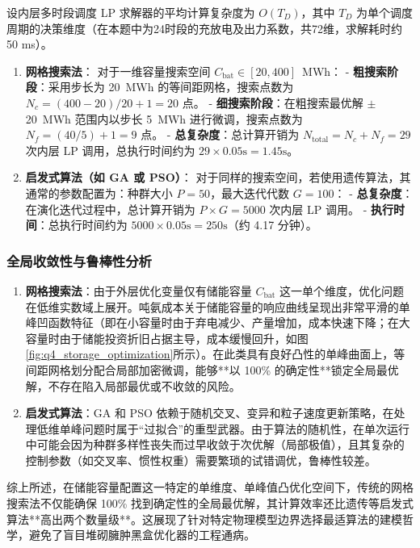 设内层多时段调度 LP 求解器的平均计算复杂度为 $O(T_D)$，其中 $T_D$ 为单个调度周期的决策维度（在本题中为24时段的充放电及出力系数，共72维，求解耗时约 50 ms）。
\begin{enumerate}
    \item \textbf{网格搜索法}：
    对于一维容量搜索空间 $C_{\text{bat}} \in [20, 400]$~MWh：
    - \textbf{粗搜索阶段}：采用步长为 20~MWh 的等间距网格，搜索点数为 $N_c = (400 - 20)/20 + 1 = 20$ 点。
    - \textbf{细搜索阶段}：在粗搜索最优解 $\pm$20~MWh 范围内以步长 5~MWh 进行微调，搜索点数为 $N_f = (40/5) + 1 = 9$ 点。
    - \textbf{总复杂度}：总计算开销为 $N_{\text{total}} = N_c + N_f = 29$ 次内层 LP 调用，总执行时间约为 $29 \times 0.05 \text{s} = 1.45 \text{s}$。
    
    \item \textbf{启发式算法（如 GA 或 PSO）}：
    对于同样的搜索空间，若使用遗传算法，其通常的参数配置为：种群大小 $P = 50$，最大迭代代数 $G = 100$：
    - \textbf{总复杂度}：在演化迭代过程中，总计算开销为 $P \times G = 5000$ 次内层 LP 调用。
    - \textbf{执行时间}：总执行时间约为 $5000 \times 0.05 \text{s} = 250 \text{s}$（约 4.17 分钟）。
\end{enumerate}

\subsubsection{全局收敛性与鲁棒性分析}

\begin{enumerate}
    \item \textbf{网格搜索法}：由于外层优化变量仅有储能容量 $C_{\text{bat}}$ 这一单个维度，优化问题在低维实数域上展开。吨氨成本关于储能容量的响应曲线呈现出非常平滑的单峰凹函数特征（即在小容量时由于弃电减少、产量增加，成本快速下降；在大容量时由于储能投资折旧占据主导，成本缓慢回升，如图\ref{fig:q4_storage_optimization}所示）。在此类具有良好凸性的单峰曲面上，等间距网格划分配合局部加密微调，能够**以 100\% 的确定性**锁定全局最优解，不存在陷入局部最优或不收敛的风险。
    \item \textbf{启发式算法}：GA 和 PSO 依赖于随机交叉、变异和粒子速度更新策略，在处理低维单峰问题时属于“过拟合”的重型武器。由于算法的随机性，在单次运行中可能会因为种群多样性丧失而过早收敛于次优解（局部极值），且其复杂的控制参数（如交叉率、惯性权重）需要繁琐的试错调优，鲁棒性较差。
\end{enumerate}

综上所述，在储能容量配置这一特定的单维度、单峰值凸优化空间下，传统的网格搜索法不仅能确保 100\% 找到确定性的全局最优解，其计算效率还比遗传等启发式算法**高出两个数量级**。这展现了针对特定物理模型边界选择最适算法的建模哲学，避免了盲目堆砌臃肿黑盒优化器的工程通病。

